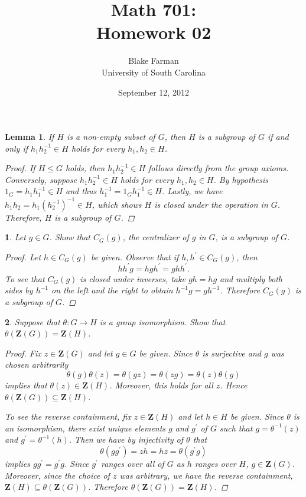 \documentclass[10pt]{amsart}
\author{Blake Farman\\University of South Carolina}
\title{Math 701:\\Homework 02}
\date{September 12, 2012}
\begin{document}
\maketitle

\newcommand{\Inn}[1]{\mathop{Inn}(#1)}
\newcommand{\Aut}[1]{\mathop{Aut}(#1)}
\newcommand{\cntr}[1]{\mathbf{Z}(#1)}

\newtheorem{thm}{}
\newtheorem{lem}{Lemma}
\begin{lem}
  If $H$ is a non-empty subset of $G$, then $H$ is a subgroup of $G$ if and only if $h_1h_2^{-1} \in H$ holds for every $h_1,h_2 \in H$.
  \begin{proof}
    If $H \leq G$ holds, then $h_1h_2^{-1} \in H$ follows directly from the group axioms.  
    Conversely, suppose $h_1h_2^{-1} \in H$ holds for every $h_1,h_2 \in H$.
    By hypothesis $1_G = h_1h_1^{-1} \in H$ and thus $h_1^{-1} = 1_Gh_1^{-1} \in H$.
    Lastly, we have $h_1h_2 = h_1(h_2^{-1})^{-1} \in H$, which shows $H$ is closed under the operation in $G$.
    Therefore, $H$ is a subgroup of $G$.
  \end{proof}
\end{lem}

\begin{thm}
  Let $g \in G$.  Show that $C_G(g)$, the centralizer of $g$ in $G$, is a subgroup of $G$.
  \begin{proof}
    Let $h \in C_G(g)$ be given.
    Observe that if $h,h^{\prime} \in C_G(g)$, then $$hh^{\prime}g = hgh^{\prime} = ghh^{\prime}.$$
    To see that $C_G(g)$ is closed under inverses, take $gh = hg$ and multiply both sides by $h^{-1}$ on the left and the right to obtain $h^{-1}g = gh^{-1}$.
    Therefore $C_G(g)$ is a subgroup of $G$.
  \end{proof}
\end{thm}

\begin{thm}
  Suppose that $\theta:G \rightarrow H$ is a group isomorphism.  Show that $\theta(\cntr{G}) = \cntr{H}$.
  \begin{proof}
    Fix $z \in \cntr{G}$ and let $g \in G$ be given.
    Since $\theta$ is surjective and $g$ was chosen arbitrarily $$\theta(g)\theta(z) = \theta(gz) = \theta(zg) = \theta(z)\theta(g)$$
    implies that $\theta(z) \in \cntr{H}$.
    Moreover, this holds for all $z$.
    Hence $\theta(\cntr{G}) \subseteq \cntr{H}$.
    
    To see the reverse containment, fix $z \in \cntr{H}$ and let $h \in H$ be given.  
    Since $\theta$ is an isomorphism, there exist unique elements $g$ and $g^{\prime}$ of $G$ such that $g = \theta^{-1}(z)$ and $g^{\prime} = \theta^{-1}(h)$.
    Then we have by injectivity of $\theta$ that
    $$\theta(gg^{\prime}) = zh = hz = \theta(g^{\prime}g)$$
    implies $gg^{\prime} = g^{\prime}g$.
    Since $g^{\prime}$ ranges over all of $G$ as $h$ ranges over $H$, $g \in \cntr{G}$.
    Moreover, since the choice of $z$ was arbitrary, we have the reverse containment, $\cntr{H} \subseteq \theta(\cntr{G})$.
    Therefore $\theta(\cntr{G}) = \cntr{H}$.
  \end{proof}
\end{thm}
\end{document}
